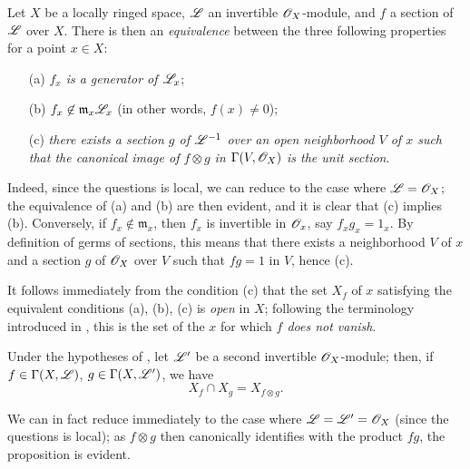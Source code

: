 \begin{env}[5.5.2]
\label{0.5.5.2}
Let $X$ be a locally ringed space, $\mathscr{L}$ an invertible $\mathscr{O}_X$-module, and $f$ a section of $\mathscr{L}$ over $X$.
There is then an \emph{equivalence} between the three following properties for a point $x\in X$:
\begin{enumerate}
  \item[(a)] \emph{$f_x$ is a generator of $\mathscr{L}_x$};
  \item[(b)] \emph{$f_x\not\in\mathfrak{m}_x\mathscr{L}_x$} (in other words, $f(x)\neq 0$);
  \item[(c)] \emph{there exists a section $g$ of $\mathscr{L}^{-1}$ over an open neighborhood $V$ of $x$ such that the canonical image of $f\otimes g$ in $\Gamma(V,\mathscr{O}_X)$  is the unit section}.
\end{enumerate}

Indeed, since the questions is local, we can reduce to the case where $\mathscr{L}=\mathscr{O}_X$;
the equivalence of (a) and (b) are then evident, and it is clear that (c) implies (b).
Conversely, if $f_x\not\in\mathfrak{m}_x$, then $f_x$ is invertible in $\mathscr{O}_x$, say $f_x g_x=1_x$.
By definition of germs of sections, this means that there exists a neighborhood $V$ of $x$ and a section $g$ of $\mathscr{O}_X$ over $V$ such that $fg=1$ in $V$, hence (c).

It follows immediately from the condition (c) that the set $X_f$ of $x$ satisfying the equivalent conditions (a), (b), (c) is \emph{open} in $X$;
following the terminology introduced in , this is the set of the $x$ for which \emph{$f$ does not vanish}.
\end{env}

\begin{env}[5.5.3]
\label{0.5.5.3}
Under the hypotheses of , let $\mathscr{L}'$ be a second invertible $\mathscr{O}_X$-module;
then, if $f\in\Gamma(X,\mathscr{L})$, $g\in\Gamma(X,\mathscr{L}')$, we have
\[
  X_f\cap X_g=X_{f\otimes g}.
\]

We can in fact reduce immediately to the case where $\mathscr{L}=\mathscr{L}'=\mathscr{O}_X$ (since the questions is local);
as $f\otimes g$ then canonically identifies with the product $fg$, the proposition is evident.
\end{env}

